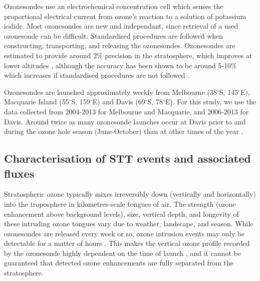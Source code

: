 \documentclass{article}
\begin{document}
    Ozonesondes use an electrochemical concentration cell which senses the proportional electrical current from ozone's reaction to a solution of potassium iodide.
    Most ozonesondes are new and independant, since retrieval of a used ozonesonde can be difficult.
    Standardised procedures are followed when constructing, transporting, and releasing the ozonesondes.
    Ozonesondes are estimated to provide around 2\% precision in the stratosphere, which improves at lower altitudes \citep{noaasondes}, although the accuracy has been shown to be around 5-10\% which increases if standardised procedures are not followed \citep{Smit2007}.
    
    Ozonesondes are launched approximately weekly from Melbourne (38$^{\circ}$S, 145$^{\circ}$E), Macquarie Island (55$^{\circ}$S, 159$^{\circ}$E) and Davis (69$^{\circ}$S, 78$^{\circ}$E). 
    For this study, we use the data collected from 2004-2013 for Melbourne and Macquarie, and 2006-2013 for Davis. 
    Around twice as many ozonesonde launches occur at Davis prior to and during the ozone hole season (June-October) than at other times of the year \citep{Alexander2013}.
    

  \subsection{Characterisation of STT events and associated fluxes}
    \label{Section:CharacterisationOfSTTs}
    
    Stratospheric ozone typically mixes irreversibly down (vertically and horizontally) into the troposphere in kilometres-scale tongues of air.
    The strength (ozone enhancement above background levels), size, vertical depth, and longevity of these intruding ozone tongues vary due to weather, landscape, and season.
    While ozonesondes are released every week or so, ozone intrusion events may only be detectable for a matter of hours \citep{Tang2012}.
    This makes the vertical ozone profile recorded by the ozonesonde highly dependent on the time of launch \citep{Sprenger2003}, and it cannot be guaranteed that detected ozone enhancements are fully separated from the stratosphere.
    
\end{document}
